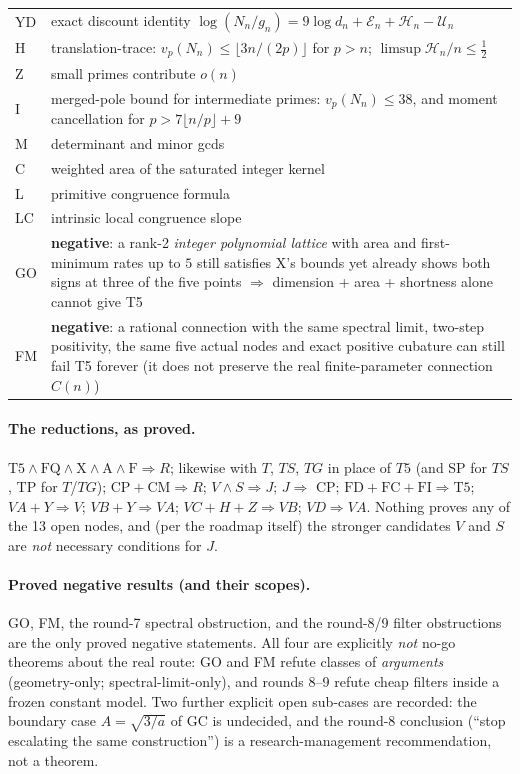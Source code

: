 \documentclass[11pt]{article}
\begin{document}
\begin{longtable}{@{}p{}p{}@{}}
YD & exact discount identity $\log(N_n/g_n)=9\log d_n+\mathcal E_n+\mathcal H_n-\mathcal U_n$ \\
H & translation-trace: $v_p(N_n)\le\lfloor3n/(2p)\rfloor$ for $p>n$; $\limsup\mathcal H_n/n\le\frac12$ \\
Z & small primes contribute $o(n)$ \\
I & merged-pole bound for intermediate primes: $v_p(N_n)\le38$, and moment cancellation for
    $p>7\lfloor n/p\rfloor+9$ \\
M & determinant and minor gcds \\
C & weighted area of the saturated integer kernel \\
L & primitive congruence formula \\
LC & intrinsic local congruence slope \\
GO & \textbf{negative}: a rank-2 \emph{integer polynomial lattice} with area and first-minimum rates
    up to $5$ still satisfies X's bounds yet already shows both signs at three of the five points
    $\Rightarrow$ dimension + area + shortness alone cannot give T5 \\
FM & \textbf{negative}: a rational connection with the same spectral limit, two-step positivity, the
    same five actual nodes and exact positive cubature can still fail T5 forever (it does not
    preserve the real finite-parameter connection $C(n)$) \\
\bottomrule
\end{longtable}

\paragraph{The reductions, as proved.}
$\mathrm{T5}\wedge\mathrm{FQ}\wedge\mathrm{X}\wedge\mathrm{A}\wedge\mathrm{F}\Rightarrow R$;
likewise with $T$, $TS$, $TG$ in place of $T5$ (and SP for $TS$, TP for $T$/$TG$);
$\mathrm{CP}+\mathrm{CM}\Rightarrow R$; $V\wedge S\Rightarrow J$; $J\Rightarrow$ CP;
$\mathrm{FD}+\mathrm{FC}+\mathrm{FI}\Rightarrow\mathrm{T5}$; $VA+Y\Rightarrow V$;
$VB+Y\Rightarrow VA$; $VC+H+Z\Rightarrow VB$; $VD\Rightarrow VA$. Nothing proves any of the 13 open
nodes, and (per the roadmap itself) the stronger candidates $V$ and $S$ are \emph{not} necessary
conditions for $J$.

\paragraph{Proved negative results (and their scopes).} GO, FM, the round-7 spectral obstruction, and
the round-8/9 filter obstructions are the only proved negative statements. All four are explicitly
\emph{not} no-go theorems about the real route: GO and FM refute classes of \emph{arguments}
(geometry-only; spectral-limit-only), and rounds 8--9 refute cheap filters inside a frozen constant
model. Two further explicit open sub-cases are recorded: the boundary case $A=\sqrt{3/a}$ of GC is
undecided, and the round-8 conclusion (``stop escalating the same construction'') is a
research-management recommendation, not a theorem.
\end{document}
